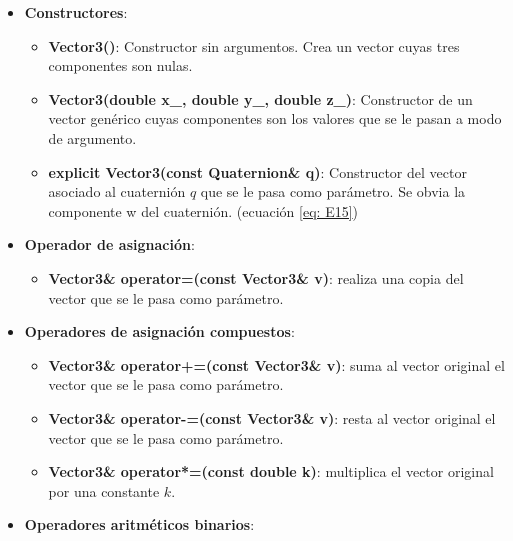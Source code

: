 \documentclass[12pt, a4paper]{report}
\begin{document}
\begin{itemize}

\item \textbf{Constructores}:

\begin{itemize}
\item \textbf{Vector3()}: Constructor sin argumentos. Crea un vector cuyas tres componentes son nulas.

\item \textbf{Vector3(double x\_, double y\_, double z\_)}: Constructor de un vector genérico cuyas componentes son los valores que se le pasan a modo de argumento.

\item \textbf{explicit Vector3(const Quaternion\& q)}: Constructor del vector asociado al cuaternión $q$ que se le pasa como parámetro. Se obvia la componente w del cuaternión. (ecuación \eqref{eq: E15})
\end{itemize}

\item \textbf{Operador de asignación}:

\begin{itemize}
\item \textbf{Vector3\& operator=(const Vector3\& v)}: realiza una copia del vector que se le pasa como parámetro.
\end{itemize} 

\item \textbf{Operadores de asignación compuestos}:

\begin{itemize}
\item \textbf{Vector3\& operator+=(const Vector3\& v)}: suma al vector original el vector que se le pasa como parámetro.
\item \textbf{Vector3\& operator-=(const Vector3\& v)}: resta al vector original el vector que se le pasa como parámetro.
\item \textbf{Vector3\& operator*=(const double k)}: multiplica el vector original por una constante $k$.
\end{itemize}

\item \textbf{Operadores aritméticos binarios}:


\end{itemize}
\end{document}
